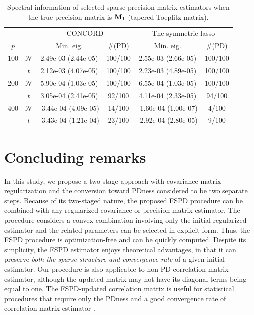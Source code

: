 \documentclass[times,sort&compress,3p]{elsarticle}
\begin{document}
\begin{table}[h]
{
\begin{center}
\begin{tabular}{cc|cc|cc}
\hline
& & \multicolumn{2}{c|}{CONCORD \citep{Khare2015}}& \multicolumn{2}{c}{The symmetric lasso  \citep{Friedman2010}} \\
$p$ & & Min. eig. & \#(PD) & Min. eig. & \#(PD)  \\
\hline
 100 & $\mathcal{N}$  & 2.49e-03 (2.44e-05) & 100/100 & 2.55e-03 (2.66e-05) & 100/100 \\
     & $t$  & 2.12e-03 (4.07e-05) & 100/100 & 2.23e-03 (4.89e-05) & 100/100 \\
\hline
 200 & $\mathcal{N}$  & 5.90e-04 (1.03e-05) & 100/100 & 6.55e-04 (1.03e-05) & 100/100 \\
     & $t$  & 3.05e-04 (2.41e-05) & 92/100 & 4.11e-04 (2.33e-05) & 94/100 \\
\hline
 400 & $\mathcal{N}$  & -3.44e-04 (4.09e-05) & 14/100 & -1.60e-04 (1.00e-07) & 4/100 \\
     & $t$  & -3.43e-04 (1.21e-04) & 23/100 & -2.92e-04 (2.80e-05) & 9/100 \\
\hline
\end{tabular}
\caption{Spectral information of selected sparse precision matrix estimators when the true precision matrix is
${\bf M}_1$ (tapered Toeplitz matrix).}
\end{center}
}
\label{table:precspectrum}
\end{table}


\section{Concluding remarks}\label{sec:concluding}

In this study, we propose a two-stage approach with covariance matrix regularization and the conversion toward
PDness considered to be two separate steps. Because of its two-staged nature, the proposed FSPD procedure can
 be combined with any regularized covariance or precision matrix estimator. The procedure considers a convex
 combination involving only the initial regularized estimator and the related parameters can be selected in explicit
 form. Thus, the FSPD procedure is optimization-free and can be quickly computed.
 Despite its simplicity, the FSPD estimator enjoys theoretical advantages, in that it can preserve {\it both the sparse structure and
 convergence rate} of a given initial estimator.
Our procedure is also applicable to non-PD correlation matrix estimator, although the updated matrix may not have its diagonal
 terms being equal to one. The FSPD-updated correlation matrix is useful for statistical procedures that require only the PDness and 
 a good convergence rate of correlation matrix estimator \citep{Kwon2016}.
\end{document}
